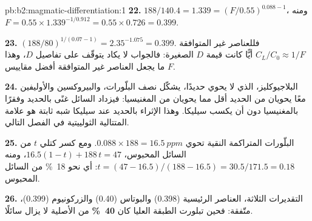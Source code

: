 \begin{solution}{pb:b2:magmatic-differentiation:1}
\textbf{22.} $188/140.4 = 1.339 = (F/0.55)^{0.088 - 1}$، ومنه $F = 0.55\times1.339^{-1/
0.912} = 0.55\times0.726 = 0.399$.

\textbf{23.} $(188/80)^{1/(0.07 - 1)} = 2.35^{-1.075} = 0.399$. فللعناصر غير المتوافقة
$C_L/C_0 \approx 1/F$ أيًّا كانت قيمة $D$ الصغيرة: فالجواب لا يكاد يتوقّف على
تفاصيل $D$، وهذا ما يجعل العناصر غير المتوافقة أفضل مقاييس $F$.

\textbf{24.} البلاجيوكليز، الذي لا يحوي حديدًا، يشكّل نصف البلّورات،
والبيروكسين والأوليفين معًا يحويان من الحديد أقل مما يحويان من المغنيسيا: فيزداد السائل
غنًى بالحديد وفقرًا بالمغنيسيا دون أن يكسب سيليكا. وهذا الإثراء
بالحديد عند سيليكا شبه ثابتة هو علامة المتتالية الثولييتية في
الفصل التالي.

\textbf{25.} البلّورات المتراكمة النقية تحوي $0.088\times188 = \qty{16.5}{ppm}$. ومع
كسر كتلي $t$ من السائل المحبوس، $16.5(1 - t) + 188\,t = 47$، ومنه $t = (47 -
16.5)/(188 - 16.5) = 30.5/171.5 = 0.18$: أي نحو \qty{18}{\percent} من السائل المحبوس.

\textbf{26.} التقديرات الثلاثة، العناصر الرئيسية (0.398) والبوتاس (0.40)
والزركونيوم (0.399)، متّفقة: فحين تبلورت الطبقة العليا كان
\textbf{\qty[text-series-to-math=true]{40}{\percent}} من  الأصلية لا يزال
سائلًا.
\end{solution}
